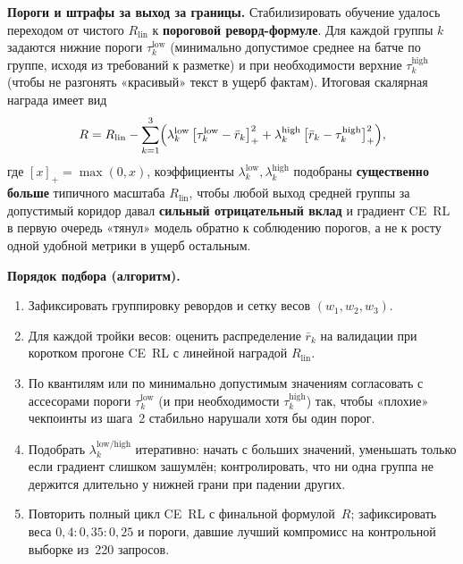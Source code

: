 \documentclass[times]{itmo-student-thesis}
\begin{document}
\textbf{Пороги и штрафы за выход за границы.} Стабилизировать обучение
удалось переходом от чистого $R_{\mathrm{lin}}$ к
\textbf{пороговой реворд-формуле}. Для каждой группы $k$ задаются
нижние пороги $\tau_k^{\mathrm{low}}$ (минимально допустимое среднее
на батче по группе, исходя из требований к разметке) и при необходимости
верхние $\tau_k^{\mathrm{high}}$ (чтобы не разгонять «красивый» текст
в ущерб фактам). Итоговая скалярная награда имеет вид
\begin{equation}
    R = R_{\mathrm{lin}} -
    \sum_{k=1}^{3}
    \Bigl(
        \lambda_k^{\mathrm{low}}\,
        \bigl[\tau_k^{\mathrm{low}} - \bar{r}_k\bigr]_{+}^{2}
        +
        \lambda_k^{\mathrm{high}}\,
        \bigl[\bar{r}_k - \tau_k^{\mathrm{high}}\bigr]_{+}^{2}
    \Bigr),
\end{equation}
где $[x]_{+} = \max(0, x)$, коэффициенты
$\lambda_k^{\mathrm{low}}, \lambda_k^{\mathrm{high}}$ подобраны
\textbf{существенно больше} типичного масштаба $R_{\mathrm{lin}}$,
чтобы любой выход средней группы за допустимый коридор давал
\textbf{сильный отрицательный вклад} и градиент CE~RL в первую очередь
«тянул» модель обратно к соблюдению порогов, а не к росту одной
удобной метрики в ущерб остальным.

\textbf{Порядок подбора (алгоритм).}
\begin{enumerate}
    \item Зафиксировать группировку ревордов и сетку весов $(w_1,w_2,w_3)$.
    \item Для каждой тройки весов: оценить распределение
          $\bar{r}_k$ на валидации при коротком прогоне CE~RL
          с линейной наградой $R_{\mathrm{lin}}$.
    \item По квантилям или по минимально допустимым значениям согласовать
          с ассесорами пороги $\tau_k^{\mathrm{low}}$ (и при необходимости
          $\tau_k^{\mathrm{high}}$) так, чтобы «плохие» чекпоинты
          из шага~2 стабильно нарушали хотя бы один порог.
    \item Подобрать $\lambda_k^{\mathrm{low/high}}$ итеративно:
          начать с больших значений, уменьшать только если градиент
          слишком зашумлён; контролировать, что ни одна группа
          не держится длительно у нижней грани при падении других.
    \item Повторить полный цикл CE~RL с финальной формулой~$R$;
          зафиксировать веса $0{,}4 : 0{,}35 : 0{,}25$ и пороги,
          давшие лучший компромисс на контрольной выборке из~220 запросов.
\end{enumerate}
\end{document}
